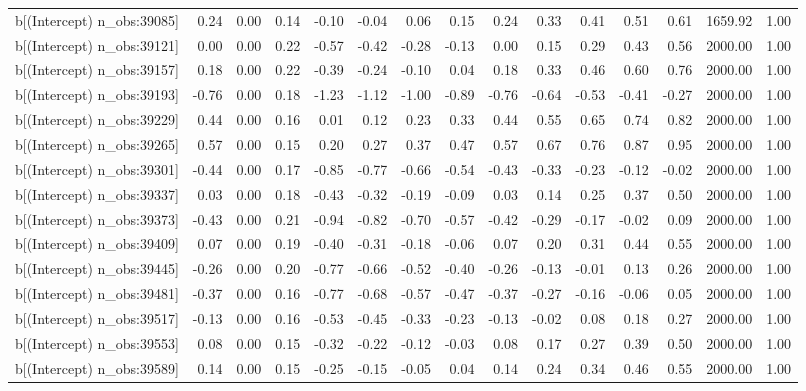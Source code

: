 \begin{table}[ht]
\begin{tabular}{rrrrrrrrrrrrrrr}
  b[(Intercept) n\_obs:39085] & 0.24 & 0.00 & 0.14 & -0.10 & -0.04 & 0.06 & 0.15 & 0.24 & 0.33 & 0.41 & 0.51 & 0.61 & 1659.92 & 1.00 \\ 
  b[(Intercept) n\_obs:39121] & 0.00 & 0.00 & 0.22 & -0.57 & -0.42 & -0.28 & -0.13 & 0.00 & 0.15 & 0.29 & 0.43 & 0.56 & 2000.00 & 1.00 \\ 
  b[(Intercept) n\_obs:39157] & 0.18 & 0.00 & 0.22 & -0.39 & -0.24 & -0.10 & 0.04 & 0.18 & 0.33 & 0.46 & 0.60 & 0.76 & 2000.00 & 1.00 \\ 
  b[(Intercept) n\_obs:39193] & -0.76 & 0.00 & 0.18 & -1.23 & -1.12 & -1.00 & -0.89 & -0.76 & -0.64 & -0.53 & -0.41 & -0.27 & 2000.00 & 1.00 \\ 
  b[(Intercept) n\_obs:39229] & 0.44 & 0.00 & 0.16 & 0.01 & 0.12 & 0.23 & 0.33 & 0.44 & 0.55 & 0.65 & 0.74 & 0.82 & 2000.00 & 1.00 \\ 
  b[(Intercept) n\_obs:39265] & 0.57 & 0.00 & 0.15 & 0.20 & 0.27 & 0.37 & 0.47 & 0.57 & 0.67 & 0.76 & 0.87 & 0.95 & 2000.00 & 1.00 \\ 
  b[(Intercept) n\_obs:39301] & -0.44 & 0.00 & 0.17 & -0.85 & -0.77 & -0.66 & -0.54 & -0.43 & -0.33 & -0.23 & -0.12 & -0.02 & 2000.00 & 1.00 \\ 
  b[(Intercept) n\_obs:39337] & 0.03 & 0.00 & 0.18 & -0.43 & -0.32 & -0.19 & -0.09 & 0.03 & 0.14 & 0.25 & 0.37 & 0.50 & 2000.00 & 1.00 \\ 
  b[(Intercept) n\_obs:39373] & -0.43 & 0.00 & 0.21 & -0.94 & -0.82 & -0.70 & -0.57 & -0.42 & -0.29 & -0.17 & -0.02 & 0.09 & 2000.00 & 1.00 \\ 
  b[(Intercept) n\_obs:39409] & 0.07 & 0.00 & 0.19 & -0.40 & -0.31 & -0.18 & -0.06 & 0.07 & 0.20 & 0.31 & 0.44 & 0.55 & 2000.00 & 1.00 \\ 
  b[(Intercept) n\_obs:39445] & -0.26 & 0.00 & 0.20 & -0.77 & -0.66 & -0.52 & -0.40 & -0.26 & -0.13 & -0.01 & 0.13 & 0.26 & 2000.00 & 1.00 \\ 
  b[(Intercept) n\_obs:39481] & -0.37 & 0.00 & 0.16 & -0.77 & -0.68 & -0.57 & -0.47 & -0.37 & -0.27 & -0.16 & -0.06 & 0.05 & 2000.00 & 1.00 \\ 
  b[(Intercept) n\_obs:39517] & -0.13 & 0.00 & 0.16 & -0.53 & -0.45 & -0.33 & -0.23 & -0.13 & -0.02 & 0.08 & 0.18 & 0.27 & 2000.00 & 1.00 \\ 
  b[(Intercept) n\_obs:39553] & 0.08 & 0.00 & 0.15 & -0.32 & -0.22 & -0.12 & -0.03 & 0.08 & 0.17 & 0.27 & 0.39 & 0.50 & 2000.00 & 1.00 \\ 
  b[(Intercept) n\_obs:39589] & 0.14 & 0.00 & 0.15 & -0.25 & -0.15 & -0.05 & 0.04 & 0.14 & 0.24 & 0.34 & 0.46 & 0.55 & 2000.00 & 1.00 \\ 

\end{tabular}
\end{table}
